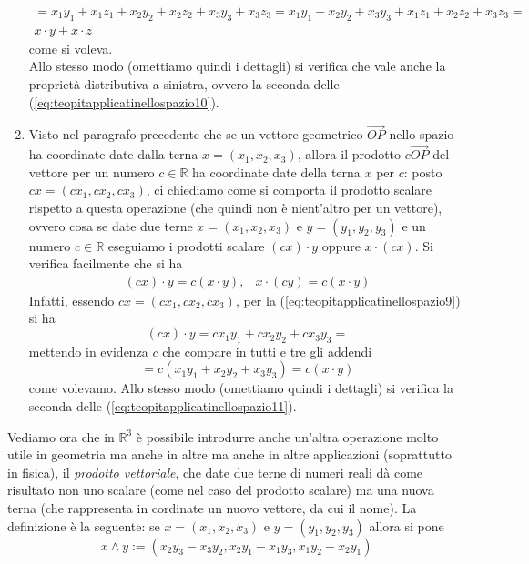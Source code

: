 \begin{enumerate}
\begin{equation*}
\begin{matrix}
      =x_1y_1+x_1z_1+x_2y_2+x_2z_2+x_3y_3+x_3z_3=x_1y_1+x_2y_2+x_3y_3+x_1z_1+x_2z_2+x_3z_3=\\
      x\cdot y+x\cdot z
    \end{matrix}
  \end{equation*}
  come si voleva.\\
  Allo stesso modo (omettiamo quindi i dettagli) si verifica che vale anche la proprietà distributiva a sinistra, ovvero la seconda delle (\ref{eq:teopitapplicatinellospazio10}).
\item Visto nel paragrafo precedente che se un vettore geometrico $\vec{OP}$ nello spazio ha coordinate date dalla terna $x=(x_1,x_2,x_3)$, allora il prodotto $c\vec{OP}$ del vettore per un numero $c\in \mathds{R}$ ha coordinate date della terna $x$ per $c$: posto $cx=(cx_1,cx_2,cx_3)$, ci chiediamo come si comporta il prodotto scalare rispetto a questa operazione (che quindi non è nient'altro per un vettore), ovvero cosa se date due terne $x=(x_1,x_2,x_3)$ e $y=(y_1,y_2,y_3)$ e un numero $c\in \mathds{R}$ eseguiamo i prodotti scalare $(cx)\cdot y$ oppure $x\cdot (cx)$. Si verifica facilmente che si ha
  \begin{eqnarray}
    \label{eq:teopitapplicatinellospazio11}
    (cx)\cdot y=c(x\cdot y), & x\cdot (cy)=c(x\cdot y)
  \end{eqnarray}
  Infatti, essendo $cx=(cx_1,cx_2,cx_3)$, per la (\ref{eq:teopitapplicatinellospazio9}) si ha
  \begin{equation*}
    (cx)\cdot y=cx_1y_1+cx_2y_2+cx_3y_3=
  \end{equation*}
  mettendo in evidenza $c$ che compare in tutti e tre gli addendi
  \begin{equation*}
    =c(x_1y_1+x_2y_2+x_3y_3)=c(x\cdot y)
  \end{equation*}
  come volevamo. Allo stesso modo (omettiamo quindi i dettagli) si verifica la seconda delle (\ref{eq:teopitapplicatinellospazio11}).
\end{enumerate}
Vediamo ora che in $\mathds{R}^3$ è possibile introdurre anche un'altra operazione molto utile in geometria ma anche in altre ma anche in altre applicazioni (soprattutto in fisica), il \textit{prodotto vettoriale}, che date due terne di numeri reali dà come risultato non uno scalare (come nel caso del prodotto scalare) ma una nuova terna (che rappresenta in cordinate un nuovo vettore, da cui il nome). La definizione è la seguente: se $x=(x_1,x_2,x_3)$ e $y=(y_1,y_2,y_3)$ allora si pone
\begin{equation}
  \label{eq:teopitapplicatinellospazio12}
  x\wedge y := (x_2y_3-x_3y_2,x_2y_1-x_1y_3,x_1y_2-x_2y_1)
\end{equation}
